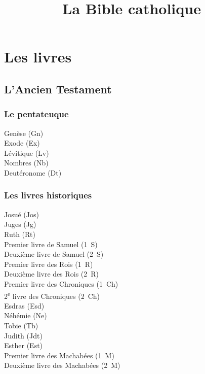 \documentclass [11pt]{article}
\title{La Bible catholique}
\date{}
\begin{document}
	\maketitle
	
	\section*{Les livres}
	\subsection*{L'Ancien Testament}
	
		\subsubsection*{Le pentateuque}
		Genèse (Gn)\\
		Exode (Ex)\\
		Lévitique (Lv)\\
		Nombres (Nb)\\
		Deutéronome (Dt)
		
		\subsubsection*{Les livres historiques}
		
		\begin{multicols}{2}
			\noindent Josué (Jos)\\
			Juges (Jg)\\
			Ruth (Rt)\\
			Premier livre de Samuel (1~S)\\
			Deuxième livre de Samuel (2~S)\\
			Premier livre des Rois (1~R)\\
			Deuxième livre des Rois (2~R)\\
			Premier livre des Chroniques (1~Ch)\\
			2\textsuperscript{e} livre des Chroniques (2~Ch)\\
			Esdras (Esd)\\
			Néhémie (Ne)\\
			Tobie (Tb)\\
			Judith (Jdt)\\
			Esther (Est)\\
			Premier livre des Machabées (1~M)\\
			Deuxième livre des Machabées (2~M)
		
		\end{multicols}
	
\end{document}
